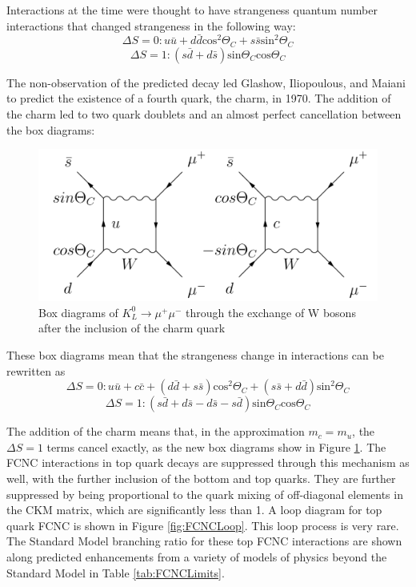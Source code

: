 Interactions at the time were thought to have strangeness quantum number interactions that changed strangeness in the following way:
\[ \Delta S=0 : u\bar{u} +d\bar{d}\text{cos}^2\Theta_C + s\bar{s} \text{sin}^2\Theta_C \]\[
\Delta S =1: (s\bar{d} + d\bar{s})\text{sin}\Theta_C \text{cos}\Theta_C  \]

The non-observation of the predicted decay led Glashow, Iliopoulous, and Maiani to predict the existence of a fourth quark, the charm, in 1970\cite{GIM}.  The addition of the charm led to two quark doublets and an almost perfect cancellation between the box diagrams:

\begin{figure}[h!]
	\centering
	\includegraphics[width=.9\columnwidth]{../ThesisImages/Theory/GIMDiagrams.png}
	\caption{Box diagrams of $K_L^0 \rightarrow \mu^+ \mu^-$ through the exchange of W bosons after the inclusion of the charm quark}
	\label{fig:KaonBox2}
\end{figure}

These box diagrams mean that the strangeness change in interactions can be rewritten as 
\[ \Delta S=0 : u\bar{u} + c\bar{c} +(d\bar{d}+s\bar{s})\text{cos}^2\Theta_C + (s\bar{s}+d\bar{d}) \text{sin}^2\Theta_C \]\[
\Delta S =1: (s\bar{d} + d\bar{s} -d\bar{s}-s\bar{d})\text{sin}\Theta_C \text{cos}\Theta_C  \]

The addition of the charm means that, in the approximation $m_c = m_u$, the $\Delta S =1$ terms cancel exactly, as the new box diagrams show in Figure \ref{fig:KaonBox2}.  The FCNC interactions in top quark decays are suppressed through this mechanism as well, with the further inclusion of the bottom and top quarks.  They are further suppressed by being proportional to the quark mixing of off-diagonal elements in the CKM matrix, which are significantly less than 1.  A loop diagram for top quark FCNC is shown in Figure \ref{fig:FCNCLoop}.  This loop process is very rare.  The Standard Model branching ratio for these top FCNC interactions are shown along predicted enhancements from a variety of models of physics beyond the Standard Model in Table \ref{tab:FCNCLimits}.

